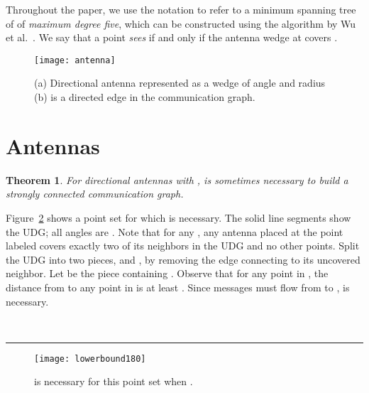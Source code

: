 \documentclass[11pt]{article}
\newtheorem{theorem}{Theorem}
\newcommand{\qed}{\rule{0.5em}{1.5ex}}
\newcommand{\fqed}{{\hfill~\qed}}
\newenvironment{proof}{{\noindent \bf Proof.}}
                      {{\hfill \fqed} \vspace{1em}}
\begin{document}
Throughout the paper, we use the notation  to refer to a minimum spanning tree of 
of \emph{maximum degree five}, which can be constructed using the algorithm
by Wu et al.~\cite{WDJLH06}. We say that a point  \emph{sees}
 if and only if the antenna wedge at  covers .

\begin{figure}[htpb]
\centering
\texttt{[image: antenna]}
\caption{(a) Directional antenna represented as a wedge of angle  and radius  (b)  is a
directed edge in the communication graph.}
\label{fig:antenna}
\end{figure}


\section{ Antennas}
\label{sec:180}

\begin{theorem}
For directional antennas with ,  is
sometimes necessary to build a strongly connected communication graph.
\label{thm:180main}
\end{theorem}
\begin{proof}
Figure~\ref{fig:lowerbound180} shows a point set for which
 is
necessary.
The solid line segments show the UDG; all angles are .
Note that for any , any antenna placed at the
point labeled  covers exactly two of its neighbors in the UDG
and no other points. Split the UDG into two pieces,  and ,
by removing the edge
connecting  to its uncovered neighbor. Let  be the
piece containing . Observe that
for any point  in ,
the distance from  to any point in  is at least .
Since messages must flow from  to ,
 is necessary.
\end{proof}
\begin{figure}[hp]
\centering
\texttt{[image: lowerbound180]}
\caption{ is necessary for this point set when .}
\label{fig:lowerbound180}
\end{figure}
\end{document}
